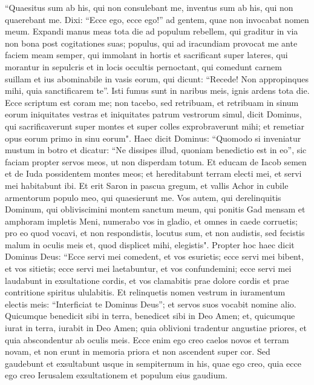 \begin{biblechapter}  
\verse “Quaesitus sum ab his, qui non consulebant me, inventus sum ab his, qui non quaerebant me. Dixi: “Ecce ego, ecce ego!” ad gentem, quae non invocabat nomen meum. 
\verse Expandi manus meas tota die ad populum rebellem, qui graditur in via non bona post cogitationes suas; 
\verse populus, qui ad iracundiam provocat me ante faciem meam semper, qui immolant in hortis et sacrificant super lateres, 
\verse qui morantur in sepulcris et in locis occultis pernoctant, qui comedunt carnem suillam et ius abominabile in vasis eorum, 
\verse qui dicunt: “Recede! Non appropinques mihi, quia sanctificarem te”. Isti fumus sunt in naribus meis, ignis ardens tota die. 
\verse Ecce scriptum est coram me; non tacebo, sed retribuam, et retribuam in sinum eorum 
\verse iniquitates vestras et iniquitates patrum vestrorum simul, dicit Dominus, qui sacrificaverunt super montes et super colles exprobraverunt mihi; et remetiar opus eorum primo in sinu eorum". 
\verse Haec dicit Dominus: “Quomodo si inveniatur mustum in botro et dicatur: “Ne dissipes illud, quoniam benedictio est in eo”, sic faciam propter servos meos, ut non disperdam totum. 
\verse Et educam de Iacob semen et de Iuda possidentem montes meos; et hereditabunt terram electi mei, et servi mei habitabunt ibi. 
\verse Et erit Saron in pascua gregum, et vallis Achor in cubile armentorum populo meo, qui quaesierunt me. 
\verse Vos autem, qui derelinquitis Dominum, qui obliviscimini montem sanctum meum, qui ponitis Gad mensam et amphoram impletis Meni, 
\verse numerabo vos in gladio, et omnes in caede corruetis; pro eo quod vocavi, et non respondistis, locutus sum, et non audistis, sed fecistis malum in oculis meis et, quod displicet mihi, elegistis". 
\verse Propter hoc haec dicit Dominus Deus: “Ecce servi mei comedent, et vos esurietis; ecce servi mei bibent, et vos sitietis; ecce servi mei laetabuntur, et vos confundemini; 
\verse ecce servi mei laudabunt in exsultatione cordis, et vos clamabitis prae dolore cordis et prae contritione spiritus ululabitis. 
\verse Et relinquetis nomen vestrum in iuramentum electis meis: “Interficiat te Dominus Deus”; et servos suos vocabit nomine alio. 
\verse Quicumque benedicit sibi in terra, benedicet sibi in Deo Amen; et, quicumque iurat in terra, iurabit in Deo Amen; quia oblivioni tradentur angustiae priores, et quia abscondentur ab oculis meis. 
\verse Ecce enim ego creo caelos novos et terram novam, et non erunt in memoria priora et non ascendent super cor. 
\verse Sed gaudebunt et exsultabunt usque in sempiternum in his, quae ego creo, quia ecce ego creo Ierusalem exsultationem et populum eius gaudium. 

\end{biblechapter}

